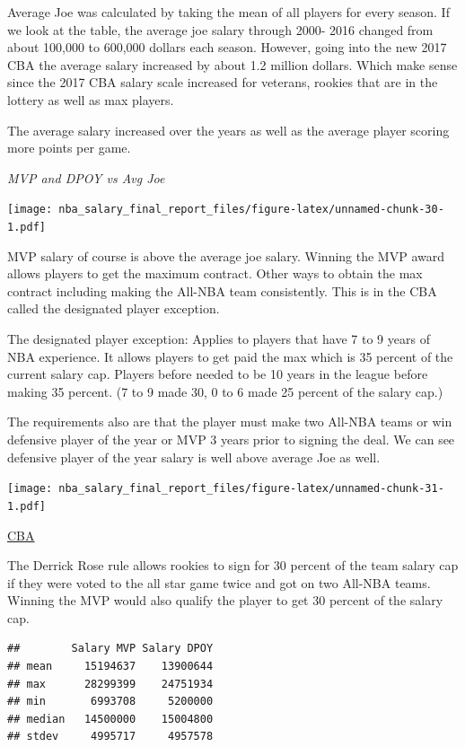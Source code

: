 \documentclass[]{article}
\begin{document}
Average Joe was calculated by taking the mean of all players for every
season. If we look at the table, the average joe salary through 2000-
2016 changed from about 100,000 to 600,000 dollars each season. However,
going into the new 2017 CBA the average salary increased by about 1.2
million dollars. Which make sense since the 2017 CBA salary scale
increased for veterans, rookies that are in the lottery as well as max
players.

The average salary increased over the years as well as the average
player scoring more points per game.

\emph{MVP and DPOY vs Avg Joe}

\texttt{[image: nba\_salary\_final\_report\_files/figure-latex/unnamed-chunk-30-1.pdf]}

MVP salary of course is above the average joe salary. Winning the MVP
award allows players to get the maximum contract. Other ways to obtain
the max contract including making the All-NBA team consistently. This is
in the CBA called the designated player exception.

The designated player exception: Applies to players that have 7 to 9
years of NBA experience. It allows players to get paid the max which is
35 percent of the current salary cap. Players before needed to be 10
years in the league before making 35 percent. (7 to 9 made 30, 0 to 6
made 25 percent of the salary cap.)

The requirements also are that the player must make two All-NBA teams or
win defensive player of the year or MVP 3 years prior to signing the
deal. We can see defensive player of the year salary is well above
average Joe as well.

\texttt{[image: nba\_salary\_final\_report\_files/figure-latex/unnamed-chunk-31-1.pdf]}

\href{https://www.foxsports.com/nba/story/nba-6-important-aspects-of-the-new-collective-bargaining-agreement-122016}{CBA}

The Derrick Rose rule allows rookies to sign for 30 percent of the team
salary cap if they were voted to the all star game twice and got on two
All-NBA teams. Winning the MVP would also qualify the player to get 30
percent of the salary cap.

\begin{verbatim}
##        Salary MVP Salary DPOY
## mean     15194637    13900644
## max      28299399    24751934
## min       6993708     5200000
## median   14500000    15004800
## stdev     4995717     4957578
\end{verbatim}
\end{document}
